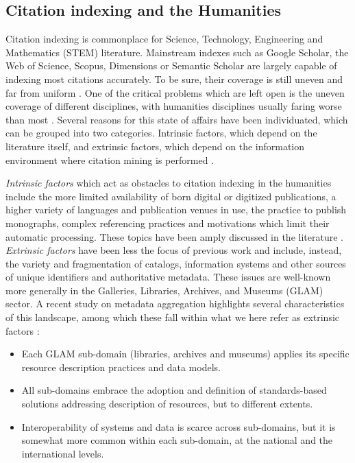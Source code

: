 \subsection{Citation indexing and the Humanities}\label{sec:citation-indexing}

Citation indexing is commonplace for Science, Technology, Engineering and Mathematics (STEM) literature. Mainstream indexes such as Google Scholar, the Web of Science, Scopus, Dimensions or Semantic Scholar are largely capable of indexing most citations accurately. To be sure, their coverage is still uneven and far from uniform \cite{martin-martin_google_2021, visser_large-scale_2021}. One of the critical problems which are left open is the uneven coverage of different disciplines, with humanities disciplines usually faring worse than most \cite{harzing_google_2016}. Several reasons for this state of affairs have been individuated, which can be grouped into two categories. Intrinsic factors, which depend on the literature itself, and extrinsic factors, which depend on the information environment where citation mining is performed \cite{colavizza_citation_2019-1}. 

\textit{Intrinsic factors} which act as obstacles to citation indexing in the humanities include the more limited availability of born digital or digitized publications, a higher variety of languages and publication venues in use, the practice to publish monographs, complex referencing practices and motivations which limit their automatic processing. These topics have been amply discussed in the literature \cite{kulczycki_publication_2018, hicks_difficulty_1999, nederhof_bibliometric_2006, huang_characteristics_2008, santos_citing_2021}. \textit{Extrinsic factors} have been less the focus of previous work and include, instead, the variety and fragmentation of catalogs, information systems and other sources of unique identifiers and authoritative metadata. These issues are well-known more generally in the Galleries, Libraries, Archives, and Museums (GLAM) sector. A recent study on metadata aggregation highlights several characteristics of this landscape, among which these fall within what we here refer as extrinsic factors \cite{freire_cultural_2020}:
\begin{itemize}
\item Each GLAM sub-domain (libraries, archives and museums) applies its specific resource description practices and data models.
\item All sub-domains embrace the adoption and definition of standards-based solutions addressing description of resources, but to different extents.
\item Interoperability of systems and data is scarce across sub-domains, but it is somewhat more common within each sub-domain, at the national and the international levels.
\end{itemize}

